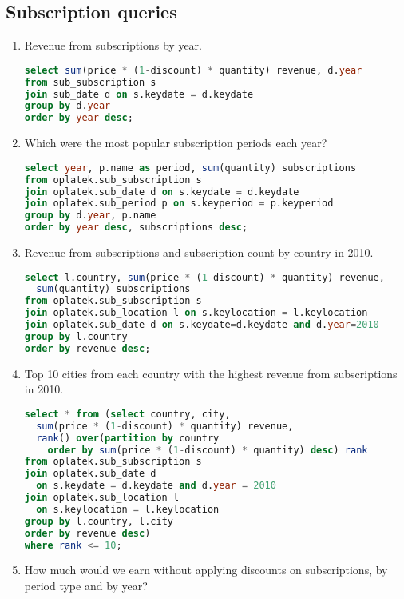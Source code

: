 \subsection*{Subscription queries} %
\label{sub:Subscription business queries}
\begin{enumerate}
  \item Revenue from subscriptions by year.
\begin{lstlisting}[language=sql]
select sum(price * (1-discount) * quantity) revenue, d.year 
from sub_subscription s 
join sub_date d on s.keydate = d.keydate 
group by d.year 
order by year desc;
\end{lstlisting}
  \item Which were the most popular subscription periods each year?
\begin{lstlisting}[language=sql]
select year, p.name as period, sum(quantity) subscriptions
from oplatek.sub_subscription s 
join oplatek.sub_date d on s.keydate = d.keydate
join oplatek.sub_period p on s.keyperiod = p.keyperiod 
group by d.year, p.name
order by year desc, subscriptions desc;
\end{lstlisting}
  \item Revenue from subscriptions and subscription count by country in 2010.
\begin{lstlisting}[language=sql]
select l.country, sum(price * (1-discount) * quantity) revenue, 
  sum(quantity) subscriptions 
from oplatek.sub_subscription s 
join oplatek.sub_location l on s.keylocation = l.keylocation 
join oplatek.sub_date d on s.keydate=d.keydate and d.year=2010
group by l.country 
order by revenue desc;
\end{lstlisting}
  \item Top 10 cities from each country with the highest revenue from subscriptions in 2010.
\begin{lstlisting}[language=sql]  
select * from (select country, city, 
  sum(price * (1-discount) * quantity) revenue, 
  rank() over(partition by country 
    order by sum(price * (1-discount) * quantity) desc) rank 
from oplatek.sub_subscription s 
join oplatek.sub_date d 
  on s.keydate = d.keydate and d.year = 2010
join oplatek.sub_location l 
  on s.keylocation = l.keylocation
group by l.country, l.city
order by revenue desc)
where rank <= 10;
\end{lstlisting}
  \item How much would we earn without applying discounts on subscriptions, by period type and by year?
\begin{lstlisting}[language=sql] 

\end{lstlisting}
\end{enumerate}

